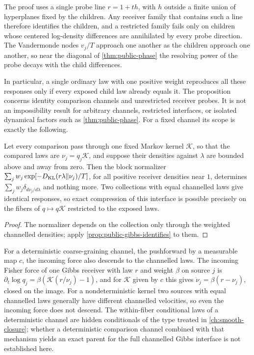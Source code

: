 The proof uses a single probe line $r=1+th$, with $h$ outside a finite union of hyperplanes fixed by the children. Any receiver family that contains such a line therefore identifies the children, and a restricted family fails only on children whose centered log-density differences are annihilated by every probe direction. The Vandermonde nodes $v_j/T$ approach one another as the children approach one another, so near the diagonal of \cref{thm:public-phase} the resolving power of the probe decays with the child differences.

In particular, a single ordinary law with one positive weight reproduces all these responses only if every exposed child law already equals it. The proposition concerns identity comparison channels and unrestricted receiver probes. It is not an impossibility result for arbitrary channels, restricted interfaces, or isolated dynamical factors such as \cref{thm:public-phase}. For a fixed channel its scope is exactly the following.

Let every comparison pass through one fixed Markov kernel $\mathcal K$, so that the compared laws are $\nu_j=q_j\mathcal K$, and suppose their densities against $\lambda$ are bounded above and away from zero. Then the block normalizer $\sum_jw_j\exp[-D_{\mathrm{KL}}(r\lambda\Vert\nu_j)/T]$, for all positive receiver densities near $1$, determines $\sum_jw_j\delta_{d\nu_j/d\lambda}$ and nothing more. Two collections with equal channelled laws give identical responses, so exact compression of this interface is possible precisely on the fibers of $q\mapsto q\mathcal K$ restricted to the exposed laws.
\begin{proof}
The normalizer depends on the collection only through the weighted channelled densities; apply \cref{prop:public-gibbs-identifies} to them.
\end{proof}

For a deterministic coarse-graining channel, the pushforward by a measurable map $c$, the incoming force also descends to the channelled laws. The incoming Fisher force of one Gibbs receiver with law $r$ and weight $\beta$ on source $j$ is $\partial_t\log q_j=\beta(\mathcal K(r/\nu_j)-1)$, and for $\mathcal K$ given by $c$ this gives $\dot\nu_j=\beta(r-\nu_j)$, closed on the image. For a nondeterministic kernel two sources with equal channelled laws generally have different channelled velocities, so even the incoming force does not descend. The within-fiber conditional laws of a deterministic channel are hidden conditionals of the type treated in \cref{ch:smooth-closure}; whether a deterministic comparison channel combined with that mechanism yields an exact parent for the full channelled Gibbs interface is not established here.


